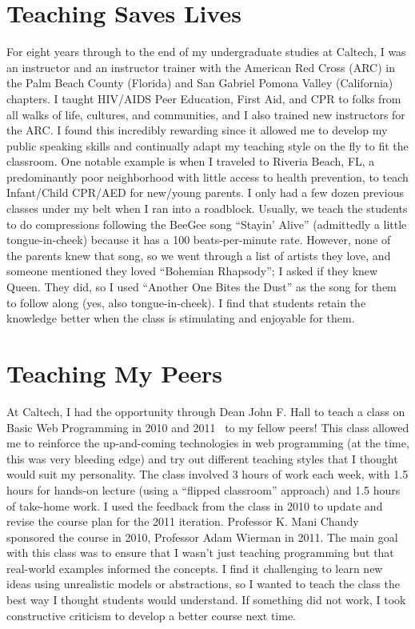 \documentclass[10pt,a4paper,sans]{moderncv} %
\begin{document}
\section{Teaching Saves Lives}
For eight years through to the end of my undergraduate studies at Caltech, I was an instructor and an instructor trainer with the American Red Cross (ARC) in the Palm Beach County (Florida) and San Gabriel Pomona Valley (California) chapters. I taught HIV/AIDS Peer Education, First Aid, and CPR to folks from all walks of life, cultures, and communities, and I also trained new instructors for the ARC. I found this incredibly rewarding since it allowed me to develop my public speaking skills and continually adapt my teaching style on the fly to fit the classroom. One notable example is when I traveled to Riveria Beach, FL, a predominantly poor neighborhood with little access to health prevention, to teach Infant/Child CPR/AED for new/young parents. I only had a few dozen previous classes under my belt when I ran into a roadblock. Usually, we teach the students to do compressions following the BeeGee song ``Stayin' Alive'' (admittedly a little tongue-in-cheek) because it has a 100 beats-per-minute rate. However, none of the parents knew that song, so we went through a list of artists they love, and someone mentioned they loved ``Bohemian Rhapsody''; I asked if they knew Queen. They did, so I used ``Another One Bites the Dust'' as the song for them to follow along (yes, also tongue-in-cheek). I find that students retain the knowledge better when the class is stimulating and enjoyable for them.

\section{Teaching My Peers}
At Caltech, I had the opportunity through Dean John F. Hall to teach a class on Basic Web Programming in 2010 and 2011~\cite{PA70c} to my fellow peers! This class allowed me to reinforce the up-and-coming technologies in web programming (at the time, this was very bleeding edge) and try out different teaching styles that I thought would suit my personality. The class involved 3 hours of work each week, with 1.5 hours for hands-on lecture (using a ``flipped classroom'' approach) and 1.5 hours of take-home work. I used the feedback from the class in 2010 to update and revise the course plan for the 2011 iteration. Professor K. Mani Chandy sponsored the course in 2010, Professor Adam Wierman in 2011. The main goal with this class was to ensure that I wasn't just teaching programming but that real-world examples informed the concepts. I find it challenging to learn new ideas using unrealistic models or abstractions, so I wanted to teach the class the best way I thought students would understand. If something did not work, I took constructive criticism to develop a better course next time.
\end{document}
